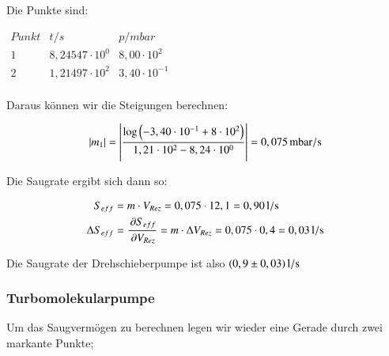 Die Punkte sind:

\begin{center}
	$
	\begin{matrix}
	Punkt	& t/s & p/mbar \\ 
	1	& 8,24547 \cdot 10^{0} & 8,00 \cdot 10^{2} \\ 
	2	& 1,21497 \cdot 10^{2} & 3,40 \cdot 10^{-1} \\ 

	\end{matrix} 
	$	
\end{center}


Daraus können wir die Steigungen berechnen:

\begin{align*}
|m_1| &= \left| \frac{\log\left(-3,40 \cdot 10^{-1} + 8 \cdot 10^{2}\right)}{1,21 \cdot 10^{2} - 8,24 \cdot 10^{0}} \right| = \unit[0,075]{mbar/s} \\
\end{align*}

Die Saugrate ergibt sich dann so:

\begin{align*}
S_{eff} &= m \cdot V_{Rez} = 0,075 \cdot 12,1 = \unit[0,90]{l/s} \\
\Delta S_{eff} &= \frac{\p S_{eff}}{\p V_{Rez}} = m \cdot \Delta V_{Rez} = 0,075 \cdot 0,4 = \unit[0,03]{l/s}
\end{align*}


Die Saugrate der Drehschieberpumpe ist also $\unit[(0,9 \pm 0,03)]{l/s}$


\subsubsection*{Turbomolekularpumpe}


Um das Saugvermögen zu berechnen legen wir wieder eine Gerade durch zwei markante Punkte;

\begin{figure}[h]
\end{figure}

